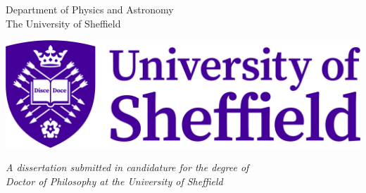 



\begin{center}
    \vspace*{2cm}

    \begin{Huge}
        \makeatletter
        \textbf{\@title}
        \makeatother
    \end{Huge}

    \vspace*{2.5cm}

    \begin{LARGE}
        \makeatletter
        \textbf{\@author}
        \makeatother
    \end{LARGE}

    \vspace*{1cm}

    \begin{Large}
        Department of Physics and Astronomy \\
        \smallskip
        The University of Sheffield
    \end{Large}

    \vspace*{2cm}

    \includegraphics[width=0.5\linewidth]{images/sheffield_newlogo.jpg}

    \vspace*{2cm}

    \begin{large}
        \textit{A dissertation submitted in candidature for the degree of} \\
        \textit{Doctor of Philosophy at the University of Sheffield}
    \end{large}

    \vspace*{1cm}

    \begin{large}
        \makeatletter
        \text{\@date}
        \makeatother
    \end{large}

    \vfill
\end{center}
